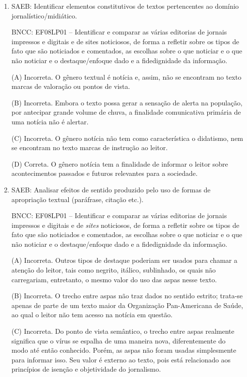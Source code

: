 \begin{enumerate}
\item
SAEB: Identificar elementos constitutivos de textos pertencentes ao
domínio jornalístico/midiático. 

BNCC: EF08LP01 -- Identificar e comparar
as várias editorias de jornais impressos e digitais e de sites
noticiosos, de forma a refletir sobre os tipos de fato que são
noticiados e comentados, as escolhas sobre o que noticiar e o que não
noticiar e o destaque/enfoque dado e a fidedignidade da informação.

(A) Incorreta. O gênero textual é notícia e, assim, não se encontram no
texto marcas de valoração ou pontos de vista. 

(B) Incorreta. Embora o
texto possa gerar a sensação de alerta na população, por antecipar
grande volume de chuva, a finalidade comunicativa primária de uma
notícia não é alertar. 

(C) Incorreta. O gênero notícia não tem como
característica o didatismo, nem se encontram no texto marcas de
instrução ao leitor. 

(D) Correta. O gênero notícia tem a finalidade de
informar o leitor sobre acontecimentos passados e futuros relevantes
para a sociedade.

\item
SAEB: Analisar efeitos de sentido produzido pelo uso de formas de
apropriação textual (paráfrase, citação etc.). 

BNCC: EF08LP01 --
Identificar e comparar as várias editorias de jornais impressos e
digitais e de \emph{sites} noticiosos, de forma a refletir sobre os
tipos de fato que são noticiados e comentados, as escolhas sobre o que
noticiar e o que não noticiar e o destaque/enfoque dado e a
fidedignidade da informação.

(A) Incorreta. Outros tipos de destaque poderiam ser usados para chamar
a atenção do leitor, tais como negrito, itálico, sublinhado, os quais
não carregariam, entretanto, o mesmo valor do uso das aspas nesse texto.

(B) Incorreta. O trecho entre aspas não traz dados no sentido estrito;
trata-se apenas de parte de um texto maior da Organização Pan-Americana
de Saúde, ao qual o leitor não tem acesso na notícia em questão. 

(C) Incorreta. Do ponto de vista semântico, o trecho entre aspas realmente
significa que o vírus se espalha de uma maneira nova, diferentemente do
modo até então conhecido. Porém, as aspas não foram usadas simplesmente
para informar isso. Seu valor é externo ao texto, pois está relacionado
aos princípios de isenção e objetividade do jornalismo. 


\end{enumerate}
